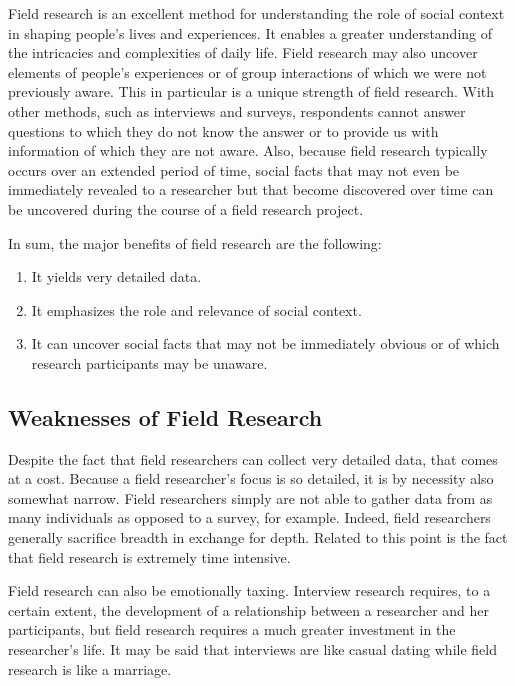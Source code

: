 Field research is an excellent method for understanding the role of social context in shaping people's lives and experiences. It enables a greater understanding of the intricacies and complexities of daily life. Field research may also uncover elements of people's experiences or of group interactions of which we were not previously aware. This in particular is a unique strength of field research. With other methods, such as interviews and surveys, respondents cannot answer questions to which they do not know the answer or to provide us with information of which they are not aware. Also, because field research typically occurs over an extended period of time, social facts that may not even be immediately revealed to a researcher but that become discovered over time can be uncovered during the course of a field research project.

In sum, the major benefits of field research are the following:

\begin{enumerate}
	\item It yields very detailed data.
	\item It emphasizes the role and relevance of social context.
	\item It can uncover social facts that may not be immediately obvious or of which research participants may be unaware.
\end{enumerate}

\subsection{Weaknesses of Field Research}

Despite the fact that field researchers can collect very detailed data, that comes at a cost. Because a field researcher's focus is so detailed, it is by necessity also somewhat narrow. Field researchers simply are not able to gather data from as many individuals as opposed to a survey, for example. Indeed, field researchers generally sacrifice breadth in exchange for depth. Related to this point is the fact that field research is extremely time intensive.

Field research can also be emotionally taxing. Interview research requires, to a certain extent, the development of a relationship between a researcher and her participants, but field research requires a much greater investment in the researcher's life. It may be said that interviews are like casual dating while field research is like a marriage.

